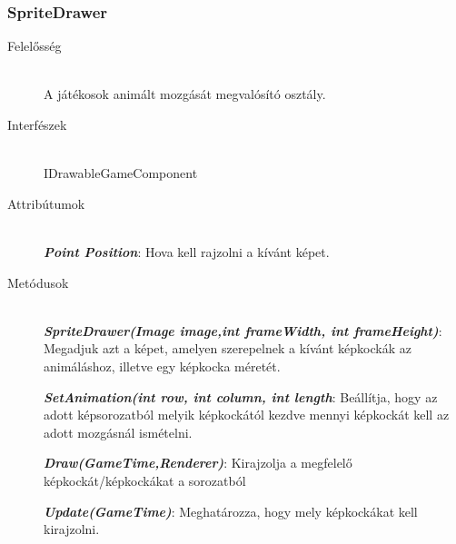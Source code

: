 \subsubsection{SpriteDrawer}
	\begin{description}
		\item[Felelősség] \hfill \\
		A játékosok animált mozgását megvalósító osztály.
		\item[Interfészek] \hfill \\
		IDrawableGameComponent
		\item[Attribútumok] \hfill \\
		\textbf{\emph{Point Position}}: Hova kell rajzolni a kívánt képet.

		\item[Metódusok] \hfill \\
		\textbf{\emph{SpriteDrawer(Image image,int frameWidth, int frameHeight)}}: Megadjuk azt a képet, amelyen szerepelnek a kívánt képkockák az animáláshoz, illetve egy képkocka méretét.

		\textbf{\emph{SetAnimation(int row, int column, int length}}: Beállítja, hogy az adott képsorozatból melyik képkockától kezdve mennyi képkockát kell az adott mozgásnál ismételni.

		\textbf{\emph{Draw(GameTime,Renderer)}}: Kirajzolja a megfelelő képkockát/képkockákat a sorozatból

		\textbf{\emph{Update(GameTime)}}: Meghatározza, hogy mely képkockákat kell kirajzolni.
		
	\end{description}
	
